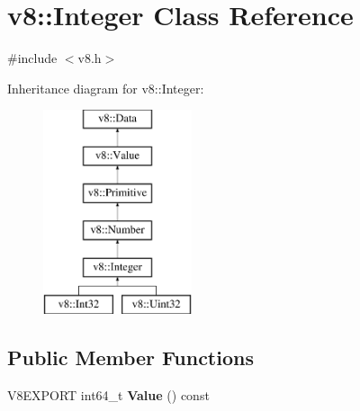 \hypertarget{classv8_1_1_integer}{}\section{v8\+:\+:Integer Class Reference}
\label{classv8_1_1_integer}


{\ttfamily \#include $<$v8.\+h$>$}

Inheritance diagram for v8\+:\+:Integer\+:\begin{figure}[H]
\begin{center}
\leavevmode
\includegraphics[height=6.000000cm]{classv8_1_1_integer}
\end{center}
\end{figure}
\subsection*{Public Member Functions}
\begin{DoxyCompactItemize}
\item 
\hypertarget{classv8_1_1_integer_ab37942d41df96bf2cd7bb27ba79c4349}{}V8\+E\+X\+P\+O\+R\+T int64\+\_\+t {\bfseries Value} () const \label{classv8_1_1_integer_ab37942d41df96bf2cd7bb27ba79c4349}

\end{DoxyCompactItemize}
